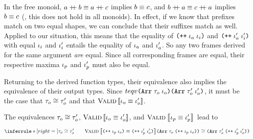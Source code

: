 \begin{sproof}
  In the free monoid,
  $a \mathbin{+\mkern-7mu+} b \equiv a \mathbin{+\mkern-7mu+} c$ implies $b \equiv c$,
  and $b \mathbin{+\mkern-7mu+} a \equiv c \mathbin{+\mkern-7mu+} a$ implies $b \equiv c$
  (\nb, this does not hold in all monoids).
  In effect, if we know that prefixes match on two equal shapes,
  we can conclude that their suffixes match as well.
  Applied to our situation,
  this means that the equality of
  $\idxappend{\idx_a \; \idx_i}$ and $\idxappend{\idx_a' \; \idx_i'}$
  with equal $\mathit{\iota}_i$ and $\mathit{\iota}_i'$
  entails the equality of $\mathit{\iota}_a$ and $\mathit{\iota}_a'$.
  So any two frames derived for the same argument \emph{are} equal.
  Since all corresponding frames are equal,
  their respective maxima $\mathit{\iota}_p$ and $\mathit{\iota}_p'$ must also be equal.

  Returning to the derived function types,
  their equivalence also implies the equivalence of their output types.
  Since $teqv{\typearray{\type_o}{\idx_o}}{\typearray{\type_o'}{\idx_o'}}$,
  it must be the case that $\mathit{\tau}_o \cong \mathit{\tau}_o'$
  and that $\text{\sc Valid} \left\llbracket \mathit{\iota}_o \equiv \mathit{\iota}_o' \right\rrbracket$.

  The equivalences $\mathit{\tau}_o \cong \mathit{\tau}_o'$, $\text{\sc Valid} \left\llbracket \mathit{\iota}_o \equiv \mathit{\iota}_o' \right\rrbracket$, and $\text{\sc Valid} \left\llbracket \mathit{\iota}_p \equiv \mathit{\iota}_p' \right\rrbracket$
  lead to
  \[\infr
  {\teqv{\type_o}{\type_o'}
    \qquad \ieqv{\idxappend{\idx_p \; \idx_o}}{\idxappend{\idx_p' \; \idx_o'}}}
  {\teqv
    {\typearray{\type_o}{\idxappend{\idx_p \; \idx_o}}}
    {\typearray{\type_o'}{\idxappend{\idx_p' \; \idx_o'}}}}\]

\end{sproof}
